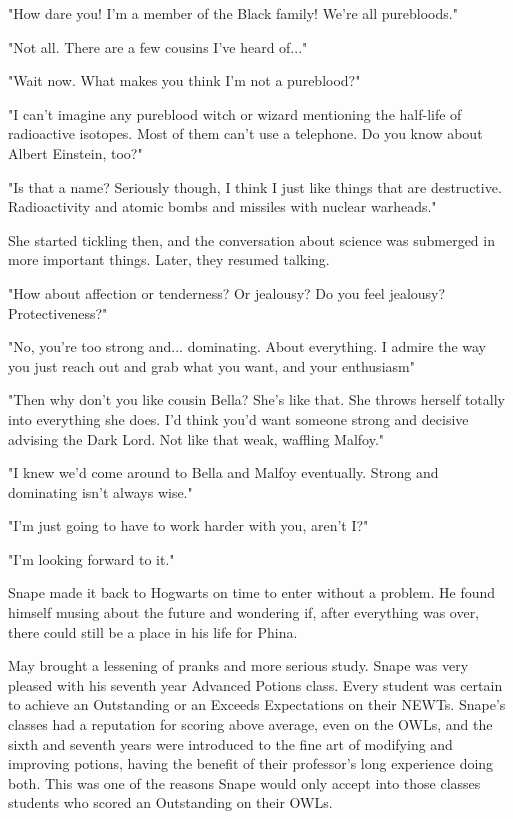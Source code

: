 "How dare you! I'm a member of the Black family! We're all purebloods."

"Not all. There are a few cousins I've heard of..."

"Wait now. What makes you think I'm not a pureblood?"

"I can't imagine any pureblood witch or wizard mentioning the half-life of radioactive isotopes. Most of them can't use a telephone. Do you know about Albert Einstein, too?"

"Is that a name? Seriously though, I think I just like things that are destructive. Radioactivity and atomic bombs and missiles with nuclear warheads."

She started tickling then, and the conversation about science was submerged in more important things. Later, they resumed talking.

"How about affection or tenderness? Or jealousy? Do you feel jealousy? Protectiveness?"

"No, you're too strong and... dominating. About everything. I admire the way you just reach out and grab what you want, and your enthusiasm"

"Then why don't you like cousin Bella? She's like that. She throws herself totally into everything she does. I'd think you'd want someone strong and decisive advising the Dark Lord. Not like that weak, waffling Malfoy."

"I knew we'd come around to Bella and Malfoy eventually. Strong and dominating isn't always wise."

"I'm just going to have to work harder with you, aren't I?"

"I'm looking forward to it."

Snape made it back to Hogwarts on time to enter without a problem. He found himself musing about the future and wondering if, after everything was over, there could still be a place in his life for Phina.

May brought a lessening of pranks and more serious study. Snape was very pleased with his seventh year Advanced Potions class. Every student was certain to achieve an Outstanding or an Exceeds Expectations on their NEWTs. Snape's classes had a reputation for scoring above average, even on the OWLs, and the sixth and seventh years were introduced to the fine art of modifying and improving potions, having the benefit of their professor's long experience doing both. This was one of the reasons Snape would only accept into those classes students who scored an Outstanding on their OWLs.

